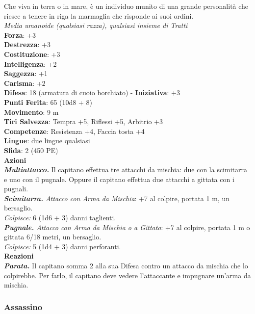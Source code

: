 \begin{multicols}{2}
Che viva in terra o in mare, è un individuo munito di una grande personalità che riesce a tenere in riga la marmaglia che risponde ai suoi ordini.\\
\emph{Media umanoide (qualsiasi razza), qualsiasi insieme di Tratti}\\
\textbf{Forza}: +3\\
\textbf{Destrezza}: +3\\
\textbf{Costituzione}: +3\\
\textbf{Intelligenza}: +2\\
\textbf{Saggezza}: +1\\
\textbf{Carisma}: +2\\
\textbf{Difesa}: 18 (armatura di cuoio borchiato) - \textbf{Iniziativa}: +3\\
\textbf{Punti Ferita}: 65 (10d8 + 8)\\
\textbf{Movimento}: 9 m\\
\textbf{Tiri Salvezza}: Tempra +5, Riflessi +5, Arbitrio +3 \\
\textbf{Competenze}: Resistenza +4, Faccia tosta +4\\
\textbf{Lingue}: due lingue qualsiasi\\
\textbf{Sfida}: 2 (450 PE)\smallskip\\
\smallskip\textbf{Azioni}\\
\emph{\textbf{Multiattacco.}} Il capitano effettua tre attacchi da mischia: due con la scimitarra e uno con il pugnale. Oppure il capitano effettua due attacchi a gittata con i pugnali.\\
\emph{\textbf{Scimitarra.} Attacco con Arma da Mischia}: +7 al colpire, portata 1 m, un bersaglio.\\
\emph{Colpisce:} 6 (1d6 + 3) danni taglienti.\\
\emph{\textbf{Pugnale.} Attacco con Arma da Mischia o a Gittata}: +7 al colpire, portata 1 m o gittata 6/18 metri, un bersaglio.\\
\emph{Colpisce:} 5 (1d4 + 3) danni perforanti.\\
\textbf{Reazioni}\\
\emph{\textbf{Parata.}} Il capitano somma 2 alla sua Difesa contro un attacco da mischia che lo colpirebbe. Per farlo, il capitano deve vedere l'attaccante e impugnare un'arma da mischia.

\subsubsection{Assassino}


\end{multicols}
